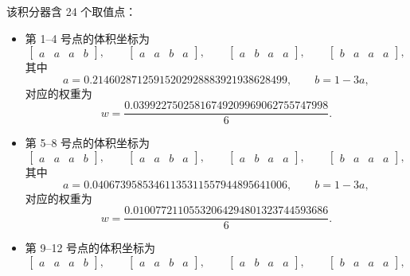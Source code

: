 该积分器含 24 个取值点：
\begin{itemize}[wide]
\item 第 1–4 号点的体积坐标为
\begin{equation}
\begin{bmatrix}a & a & a & b\end{bmatrix},\qquad\begin{bmatrix}a & a & b & a\end{bmatrix},\qquad\begin{bmatrix}a & b & a & a\end{bmatrix},\qquad\begin{bmatrix}b & a & a & a\end{bmatrix},
\end{equation}
其中
\begin{equation}
a=0.21460287125915202928883921938628499,\qquad b=1-3a,
\end{equation}
对应的权重为
\begin{equation}
w=\frac{0.03992275025816749209969062755747998}{6}.
\end{equation}
\item 第 5–8 号点的体积坐标为
\begin{equation}
\begin{bmatrix}a & a & a & b\end{bmatrix},\qquad\begin{bmatrix}a & a & b & a\end{bmatrix},\qquad\begin{bmatrix}a & b & a & a\end{bmatrix},\qquad\begin{bmatrix}b & a & a & a\end{bmatrix},
\end{equation}
其中
\begin{equation}
a=0.04067395853461135311557944895641006,\qquad b=1-3a,
\end{equation}
对应的权重为
\begin{equation}
w=\frac{0.01007721105532064294801323744593686}{6}.
\end{equation}
\item 第 9–12 号点的体积坐标为
\begin{equation}
\begin{bmatrix}a & a & a & b\end{bmatrix},\qquad\begin{bmatrix}a & a & b & a\end{bmatrix},\qquad\begin{bmatrix}a & b & a & a\end{bmatrix},\qquad\begin{bmatrix}b & a & a & a\end{bmatrix},

\end{equation}
\end{itemize}
